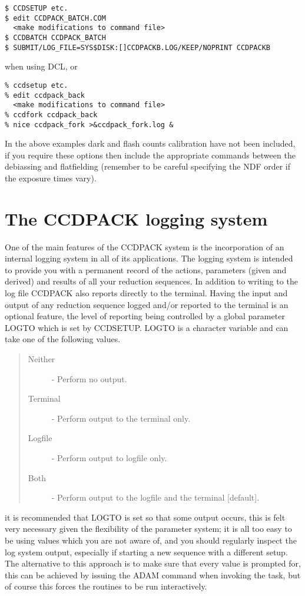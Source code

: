 \begin{myquote}
\begin{verbatim}
$ CCDSETUP etc.
$ edit CCDPACK_BATCH.COM
  <make modifications to command file>
$ CCDBATCH CCDPACK_BATCH
$ SUBMIT/LOG_FILE=SYS$DISK:[]CCDPACKB.LOG/KEEP/NOPRINT CCDPACKB
\end{verbatim}
\end{myquote}
when using DCL, or 
\begin{myquote}
\begin{verbatim}
% ccdsetup etc.
% edit ccdpack_back
  <make modifications to command file>
% ccdfork ccdpack_back
% nice ccdpack_fork >&ccdpack_fork.log &
\end{verbatim}
\end{myquote}

In the above examples dark and flash counts calibration have not been
included, if you require these options then include the appropriate
commands between the debiassing and flatfielding (remember to be careful
specifying the NDF order if the exposure times vary).

\section{The CCDPACK logging system}
\label{logsystem}

One of the main features of the CCDPACK system is the incorporation of
an internal logging system in all of its applications. The logging
system is intended to provide you with a permanent record of the
actions, parameters (given and derived) and results of all your
reduction sequences. In addition to writing to the log file CCDPACK also
reports directly to the terminal.  Having the input and output of any
reduction sequence logged and/or reported to the terminal is an optional
feature, the level of reporting being controlled by a global parameter
LOGTO which is set by CCDSETUP. LOGTO is a character variable and can
take one of the following values.
\begin{quote}
\begin{description}
\item [Neither] - Perform no output.
\item [Terminal] - Perform output to the terminal only.
\item [Logfile] - Perform output to logfile only.
\item [Both] - Perform output to the logfile and the terminal [default].
\end{description}
\end{quote}
it is recommended that LOGTO is set so that some output occurs, this is
felt very necessary given the flexibility of the parameter system; it is
all too easy to be using values which you are not aware of, and you
should regularly inspect the log system output, especially if starting a
new sequence with a different setup. The alternative to this approach is
to make sure that every value is prompted for, this can be achieved by
issuing the ADAM command  when invoking the task, but of course
this forces the routines to be run interactively.

